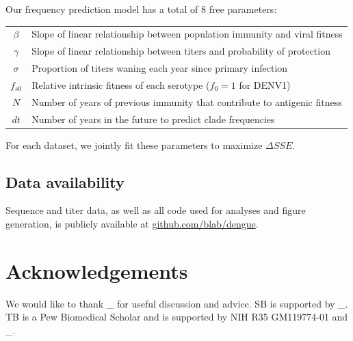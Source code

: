 \documentclass[11pt,oneside,letterpaper]{article}
\begin{document}
Our frequency prediction model has a total of 8 free parameters:
\begin{table}[h!]
  \begin{center}
    \label{tab:table1}
    \begin{tabular}{c|l}
      $\beta$ & Slope of linear relationship between population immunity and viral fitness\\
      $\gamma$ & Slope of linear relationship between titers and probability of protection\\
      $\sigma$ & Proportion of titers waning each year since primary infection\\
      $f_{s0}$ & Relative intrinsic fitness of each serotype ($f_0 = 1$ for DENV1)\\
      $N$ & Number of years of previous immunity that contribute to antigenic fitness\\
      $dt$ & Number of years in the future to predict clade frequencies\\
    \end{tabular}
  \end{center}
\end{table}

For each dataset, we jointly fit these parameters to maximize $\Delta SSE$.

\subsection*{Data availability}
Sequence and titer data, as well as all code used for analyses and figure generation, is publicly available at \href{https://github.com/blab/dengue}{github.com/blab/dengue}.

\section*{Acknowledgements}
We would like to thank \_ for useful discussion and advice.
SB is supported by \_.
TB is a Pew Biomedical Scholar and is supported by NIH R35 GM119774-01 and \_.

% 
% 

\newpage


%
%
%
%

\end{document}
